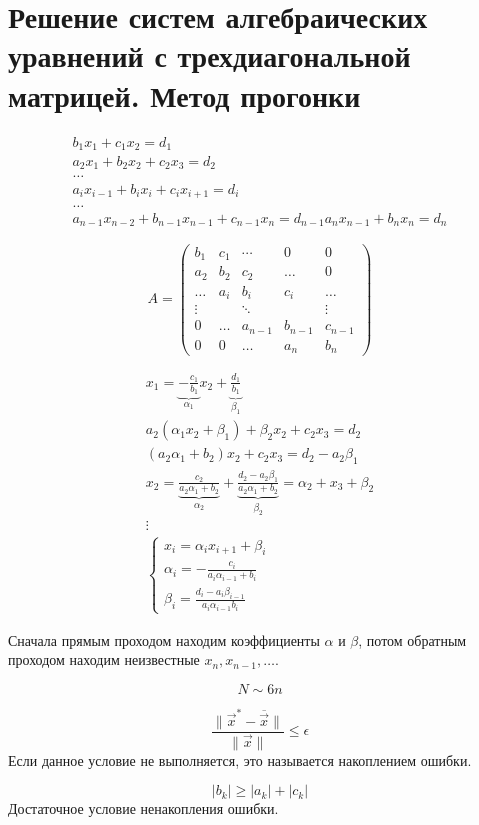 \section{Решение систем алгебраических уравнений с трехдиагональной матрицей. Метод прогонки}

\begin{gather*}
  b_1 x_1 + c_1 x_2  = d_1\\
  a_2 x_1 + b_2 x_2 + c_2 x_3 = d_2 \\
  \dots \\
  a_i x_{i - 1} + b_i x_i + c_i x_{i + 1} = d_i \\
  \dots \\
  a_{n - 1} x_{n - 2} + b_{n - 1} x_{n - 1} + c_{n - 1} x_n = d_{n - 1}
  a_n x_{n - 1}+ b_n x_n = d_n
\end{gather*}

\[
  A =
  \begin{pmatrix}
    b_1      &c_1   &\cdots   &0         &0\\
    a_2      &b_2   &c_2      &\dots     &0\\
    \dots    &a_i   &b_i      &c_i       &\dots\\
    \vdots   &      & \ddots  &          & \vdots\\
    0        &\dots &a_{n - 1}&b_{n - 1} &c_{n - 1}\\
    0        & 0    & \dots   &a_n       &b_n
  \end{pmatrix}
\]

\begin{gather*}
  x_1 = \underbrace{-\frac{c_1}{b_1}}_{\alpha_1} x_2 +
  \underbrace{\frac{d_1}{b_1}}_{\beta_1} \\
  a_2(\alpha_1 x_2 + \beta_1) + \beta_2 x_2 + c_2 x_3 = d_2 \\
  (a_2 \alpha_1 + b_2) x_2 + c_2 x_3 = d_2 - a_2 \beta_1 \\
  x_2 = \underbrace{\frac{c_2}{a_2\alpha_1 + b_2}}_{\alpha_2} + \underbrace{\frac{d_2 - a_2 \beta_1} {a_2 \alpha_1 +
    b_2}}_{\beta_2} = \alpha_2 + x_3 + \beta_2 \\
  \vdots\\
  \begin{cases}
    x_i = \alpha_i x_{i + 1} + \beta_i\\
    \alpha_i = - \frac{c_i}{a_i \alpha_{i - 1} + b_i} \\
    \beta_i = \frac{d_i - a_i \beta_{i - 1}}{a_i \alpha_{i - 1} b_i}
  \end{cases}
\end{gather*}

Сначала прямым проходом находим коэффициенты $\alpha$ и $\beta$, потом обратным
проходом находим неизвестные $x_n, x_{n - 1}, \dotsc$. 

\[
  N \sim 6n
\]

\begin{note}
  \[
    \frac{\|\vec{x}^* - \overline{\vec{x}}\|}{\|\vec{x}\|} \leq \epsilon
  \]
  Если данное условие не выполняется, это называется накоплением ошибки.
\end{note}

\begin{note}
  \[
    |b_k| \geq |a_k| + |c_k|
  \] 
  Достаточное условие ненакопления ошибки.
\end{note}